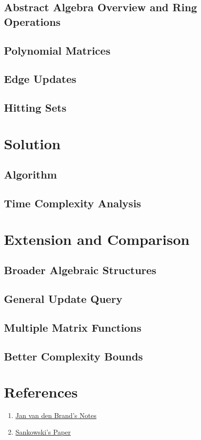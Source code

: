 \documentclass[12pt]{article}
\begin{document}
\subsection{Abstract Algebra Overview and Ring Operations}
\subsection{Polynomial Matrices}
\subsection{Edge Updates}
\subsection{Hitting Sets}

\section{Solution}
\subsection{Algorithm}
\subsection{Time Complexity Analysis}

\section{Extension and Comparison}
\subsection{Broader Algebraic Structures}
\subsection{General Update Query}
\subsection{Multiple Matrix Functions}
\subsection{Better Complexity Bounds}

\section*{References}

\begin{enumerate}
    \item \href{https://www.dropbox.com/scl/fi/zjfbk8dbxbzcn05dr8l11/fall22_daa_lecturenotes.pdf?rlkey=g6z7z1hvj7jknvlpy1s3dqcjw&e=1&st=13r18doq&dl=0}{Jan van den Brand's Notes}
    \item \href{https://www.dropbox.com/scl/fi/5w4k0lg0u8e36zugapp6c/Sankowski-COCOON-05-subquadratic-dynamic-distances.pdf?rlkey=5eahwsl7a49kwxyvlr7yqyoz3&e=2&st=d3zo7owc&dl=0}{Sankowski's Paper}
\end{enumerate}
\end{document}

